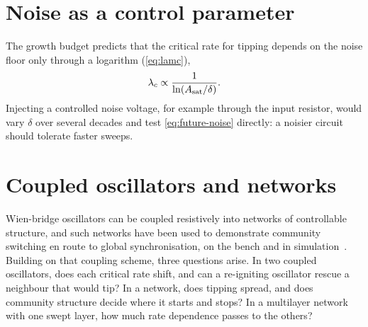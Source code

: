 
\section{Noise as a control parameter}\label{sec:future-noise}

The growth budget predicts that the critical rate for tipping depends on the noise floor only through a
logarithm (\cref{eq:lamc}),
\begin{equation}
  \lambda_{c} \propto \frac{1}{\ln(A_{\mathrm{sat}}/\delta)} .
  \label{eq:future-noise}
\end{equation}
Injecting a controlled noise voltage, for example through the input resistor, would
vary $\delta$ over several decades and test \cref{eq:future-noise} directly: a noisier circuit should
tolerate faster sweeps.

\section{Coupled oscillators and networks}\label{sec:future-networks}

Wien-bridge oscillators can be coupled resistively into networks of controllable structure, and such networks have been used to demonstrate community
switching en route to global synchronisation, on the bench and in simulation~\cite{Yadav2025}. Building
on that coupling scheme, three questions arise. In two coupled oscillators, does each critical rate shift,
and can a re-igniting oscillator rescue a neighbour that would tip? In a network, does tipping spread, and
does community structure decide where it starts and stops? In a multilayer network with one swept layer,
how much rate dependence passes to the others?
